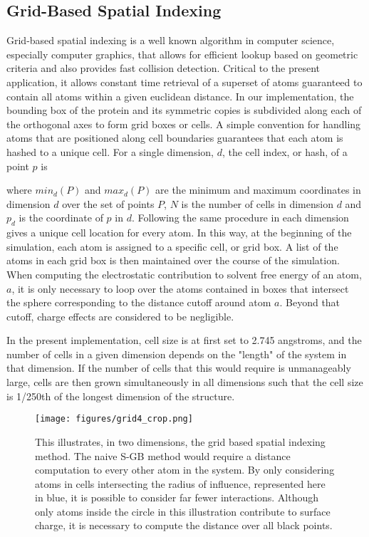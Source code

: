 \subsection*{Grid-Based Spatial Indexing}
\label{subsec:grid_based_indexing}
Grid-based spatial indexing is a well known algorithm in computer science, especially computer graphics, that allows for efficient lookup based on geometric criteria and also provides fast collision detection\cite{bentley1979data}.
Critical to the present application, it allows constant time retrieval of a superset of atoms guaranteed to contain all atoms within a given euclidean distance.
In our implementation, the bounding box of the protein and its symmetric copies is subdivided along each of the orthogonal axes to form grid boxes or cells.
A simple convention for handling atoms that are positioned along cell boundaries guarantees that each atom is hashed to a unique cell.
For a single dimension, $d$, the cell index, or hash, of a point $p$ is 

where $min_d(P)$ and $max_d(P)$ are the minimum and maximum coordinates in dimension $d$ over the set of points $P$, $N$ is the number of cells in dimension $d$ and $p_{d}$ is the coordinate of $p$ in $d$.
Following the same procedure in each dimension gives a unique cell location for every atom.
In this way, at the beginning of the simulation, each atom is assigned to a specific cell, or grid box.
A list of the atoms in each grid box is then maintained over the course of the simulation.
When computing the electrostatic contribution to solvent free energy of an atom, $a$, it is only necessary to loop over the atoms contained in boxes that intersect the sphere corresponding to the distance cutoff around atom $a$. 
Beyond that cutoff, charge effects are considered to be negligible\cite{gallicchio2004agbnp}.

In the present implementation, cell size is at first set to 2.745 angstroms, and the number of cells in a given dimension depends on the "length" of the system in that dimension.
If the number of cells that this would require is unmanageably large, cells are then grown simultaneously in all dimensions such that the cell size is 1/250th of the longest dimension of the structure.

\begin{figure}[h]
\begin{center}
\texttt{[image: figures/grid4\_crop.png]}
\caption{This illustrates, in two dimensions, the grid based spatial indexing method.
The naive S-GB method would require a distance computation to every other atom in the system.
By only considering atoms in cells intersecting the radius of influence, represented here in blue, it is possible to consider far fewer interactions.
Although only atoms inside the circle in this illustration contribute to surface charge, it is necessary to compute the distance over all black points.}
\label{fig:grid_hash}
\end{center}
\end{figure}

